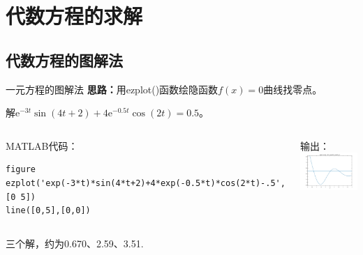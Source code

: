 \documentclass[12pt]{beamer}
\begin{document}
\section{代数方程的求解}
	\subsection{代数方程的图解法}
\begin{frame}[fragile]{一元方程的图解法}
		  	\textbf{思路：}用ezplot()函数绘隐函数$f(x)=0$曲线找零点。
			 \begin{example}[6-1]
				解$\mathrm{e}^{-3 t} \sin (4 t+2)+4 \mathrm{e}^{-0.5 t} \cos (2 t)=0.5$。

		  	\begin{columns}[T]
			  	\begin{block}{MATLAB代码：}
    \begin{lstlisting}
figure
ezplot('exp(-3*t)*sin(4*t+2)+4*exp(-0.5*t)*cos(2*t)-.5',[0 5])
line([0,5],[0,0])
    \end{lstlisting}	
			\end{block}	  		
				\begin{block}{输出：}
					\centering
					\includegraphics[width=\textwidth]{11}
				 \end{block}
		  	\end{columns}
三个解，约为0.670、2.59、3.51.
		\end{example}
\end{frame}
\end{document}
